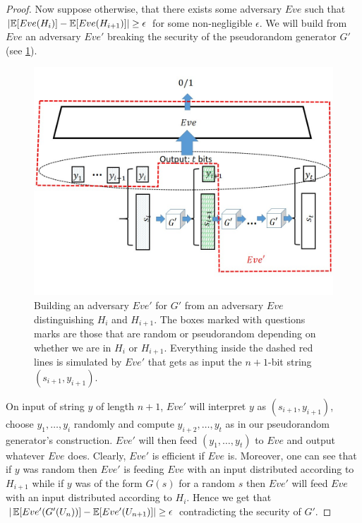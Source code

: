 \begin{proof}
Now suppose otherwise, that there exists some adversary \(Eve\) such
that \(\left| \operatorname*{\mathbb E}[Eve(H_i)] - \operatorname*{\mathbb E}[Eve(H_{i+1})] \right| \geq \epsilon\)
for some non-negligible \(\epsilon\). We will build from \(Eve\) an
adversary \(Eve'\) breaking the security of the pseudorandom generator
\(G'\) (see \cref{reductionlengthextendfig}).


\begin{figure}
\centering
\includegraphics[width=\textwidth, height=0.25\paperheight, keepaspectratio]{../figure/length-extension-prg-adversary.jpg}
\caption{Building an adversary \(Eve'\) for \(G'\) from an adversary
\(Eve\) distinguishing \(H_i\) and \(H_{i+1}\). The boxes marked with
questions marks are those that are random or pseudorandom depending on
whether we are in \(H_i\) or \(H_{i+1}\). Everything inside the dashed
red lines is simulated by \(Eve'\) that gets as input the \(n+1\)-bit
string \((s_{i+1},y_{i+1})\).}
\label{reductionlengthextendfig}
\end{figure}

On input of string \(y\) of length \(n+1\), \(Eve'\) will interpret
\(y\) as \((s_{i+1},y_{i+1})\), choose \(y_1,\ldots,y_i\) randomly and
compute \(y_{i+2},\ldots,y_t\) as in our pseudorandom generator's
construction. \(Eve'\) will then feed \((y_1,\ldots,y_t)\) to \(Eve\)
and output whatever \(Eve\) does. Clearly, \(Eve'\) is efficient if
\(Eve\) is. Moreover, one can see that if \(y\) was random then \(Eve'\)
is feeding \(Eve\) with an input distributed according to \(H_{i+1}\)
while if \(y\) was of the form \(G(s)\) for a random \(s\) then \(Eve'\)
will feed \(Eve\) with an input distributed according to \(H_i\). Hence
we get that \(| \operatorname*{\mathbb E}[ Eve'(G'(U_n))] - \operatorname*{\mathbb E}[Eve'(U_{n+1})] | \geq \epsilon\)
contradicting the security of \(G'\).

\end{proof}

